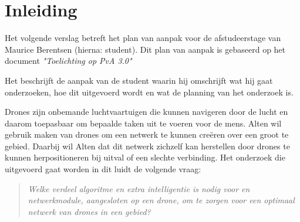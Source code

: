 \documentclass[a4paper, 11pt, oneside]{report}
\begin{document}

\tableofcontents
\clearpage







\chapter{Inleiding}
\label{chapter:inleiding}
Het volgende verslag betreft het plan van aanpak voor de afstudeerstage van Maurice Berentsen (hierna: student).
Dit plan van aanpak is gebaseerd op het document \textit{"Toelichting op PvA 3.0"} \cite{HoePVA}

Het beschrijft de aanpak van de student waarin hij omschrijft wat hij gaat onderzoeken, 
hoe dit uitgevoerd wordt en wat de planning van het onderzoek is.

Drones zijn onbemande luchtvaartuigen die kunnen navigeren door de lucht en daarom toepasbaar om bepaalde taken uit te voeren voor de mens.
Alten wil gebruik maken van drones om een netwerk te kunnen creëren over een groot te gebied. 
Daarbij wil Alten dat dit netwerk zichzelf kan herstellen door drones te kunnen herpositioneren bij uitval of een slechte verbinding.
Het onderzoek die uitgevoerd gaat worden in dit luidt de volgende vraag:
\begin{quotation}
	\textit{Welke verdeel algoritme en extra intelligentie is nodig voor en netwerkmodule, aangesloten op een drone, om te zorgen voor een optimaal netwerk van drones in een gebied?}
\end{quotation}
\end{document}
